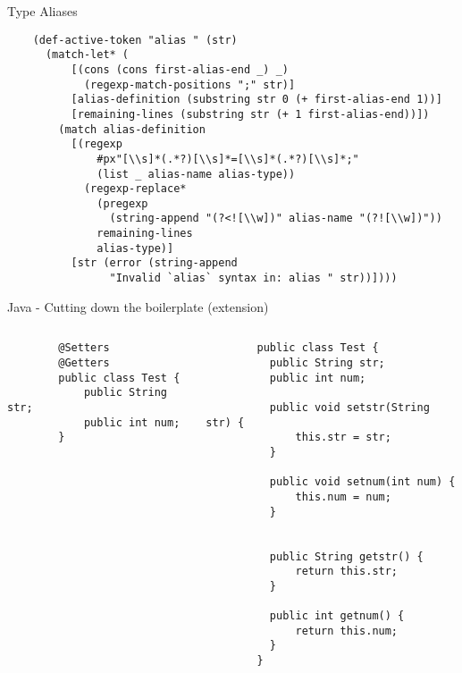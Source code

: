 \documentclass[13pt]{beamer}
\begin{document}
\begin{frame}[fragile]{Type Aliases}
  \note{
    
  }
  \begin{verbatim}
    (def-active-token "alias " (str)
      (match-let* (
          [(cons (cons first-alias-end _) _)
            (regexp-match-positions ";" str)]
          [alias-definition (substring str 0 (+ first-alias-end 1))]
          [remaining-lines (substring str (+ 1 first-alias-end))])
        (match alias-definition
          [(regexp
              #px"[\\s]*(.*?)[\\s]*=[\\s]*(.*?)[\\s]*;"
              (list _ alias-name alias-type))
            (regexp-replace*
              (pregexp
                (string-append "(?<![\\w])" alias-name "(?![\\w])"))
              remaining-lines
              alias-type)]
          [str (error (string-append
                "Invalid `alias` syntax in: alias " str))])))

 \end{verbatim}
\end{frame}

\begin{frame}[fragile]{Java - Cutting down the boilerplate (extension)}
  \note{
    
  }
  \begin{columns}
      \begin{verbatim}
        @Setters
        @Getters
        public class Test {
            public String str;
            public int num;
        }
     \end{verbatim}
      \begin{verbatim}
        public class Test {
          public String str;
          public int num;

          public void setstr(String str) {
              this.str = str;
          }

          public void setnum(int num) {
              this.num = num;
          }


          public String getstr() {
              return this.str;
          }

          public int getnum() {
              return this.num;
          }
        }
      \end{verbatim}
  \end{columns}

\end{frame}
\end{document}
